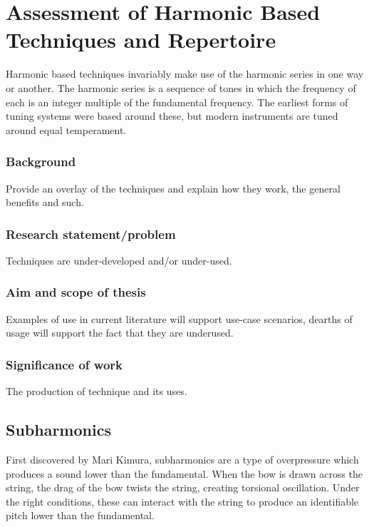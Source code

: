 
\chapter{Assessment of Harmonic Based Techniques and Repertoire}

Harmonic based techniques invariably make use of the harmonic series in one way or another. The harmonic series is a sequence of tones in which the frequency of each is an integer multiple of the fundamental frequency. The earliest forms of tuning systems were based around these, but modern instruments are tuned around equal temperament.

\subsection{Background}
Provide an overlay of the techniques and explain how they work, the general benefits and such.
\subsection{Research statement/problem}
Techniques are under-developed and/or under-used.

\subsection{Aim and scope of thesis}
Examples of use in current literature will support use-case scenarios, dearths of usage will support the fact that they are underused.

\subsection{Significance of work}
The production of technique and its uses.

\section{Subharmonics}
First discovered by Mari Kimura, subharmonics are a type of overpressure which produces a sound lower than the fundamental.\autocite{kimuraHowProduceSubharmonics1999}  When the bow is drawn across the string, the drag of the bow twists the string, creating torsional oscillation. Under the right conditions, these can interact with the string to produce an identifiable pitch lower than the fundamental.\autocite{Subharmonics2006} \lipsum[3]



